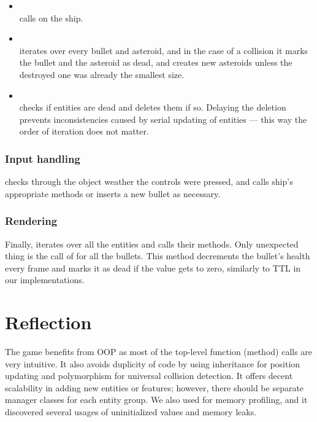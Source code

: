 \documentclass[
  digital, %
  color,   %
  table,   %
  oneside, %
  lof,     %
  lot,     %
]{fithesis3}
\begin{document}
{\begin{itemize}[--]
    \item {}\\
    calls  on the ship.

    \item {}\\
    iterates over every bullet and asteroid, and in the case of a collision it
    marks the bullet and the asteroid as dead, and creates new asteroids
    unless the destroyed one was already the smallest size.

    \item {}\\
    checks if entities are dead and deletes them if so.
    Delaying the deletion prevents inconsistencies caused by serial
    updating of entities --- this way the order of iteration does not matter.
\end{itemize}

\subsubsection{Input handling}
 checks through the  object
weather the controls were pressed, and calls ship's appropriate methods or
inserts a new bullet as necessary.

\subsubsection{Rendering}
Finally,  iterates over all the entities and calls their
 methods.
Only unexpected thing is the call of  for all the bullets.
This method decrements the bullet's health every frame and marks it as dead
if the value gets to zero, similarly to TTL in our implementations.



\section{Reflection}
The game benefits from OOP as most of the top-level function (method) calls
are very intuitive. It also avoids duplicity of code by using inheritance for position updating
and polymorphism for universal collision detection.
It offers decent scalability in adding new entities or features;
however, there should be separate manager classes for each entity group.
We also used  for memory profiling, and it discovered
several usages of uninitialized values and memory leaks.

}
\end{document}
